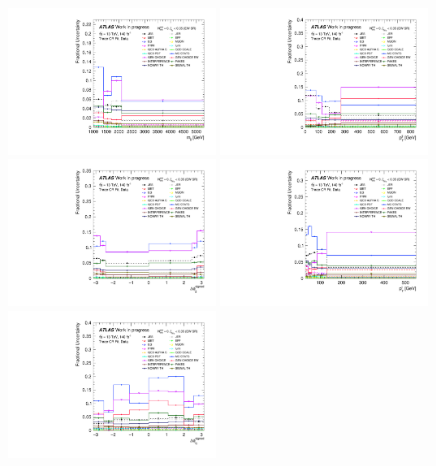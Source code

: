 \begin{figure}[H]
    \centering
    \includegraphics[width=0.49\textwidth]{plots/diffx/sigthresholds/1p6/Systematic_Uncertainties_data_mjj_3cr_QCD_Sh2211_1p6sigma.pdf}
    \includegraphics[width=0.49\textwidth]{plots/diffx/sigthresholds/1p6/Systematic_Uncertainties_data_jj_pt_3cr_QCD_Sh2211_1p6sigma.pdf}
    \includegraphics[width=0.49\textwidth]{plots/diffx/sigthresholds/1p6/Systematic_Uncertainties_data_jj_dphi_3cr_QCD_Sh2211_1p6sigma.pdf}
    \includegraphics[width=0.49\textwidth]{plots/diffx/sigthresholds/1p6/Systematic_Uncertainties_data_lep_pt_3cr_QCD_Sh2211_1p6sigma.pdf}
    \includegraphics[width=0.49\textwidth]{plots/diffx/sigthresholds/1p6/Systematic_Uncertainties_data_lepgam_dphi_3cr_QCD_Sh2211_1p6sigma.pdf}

\end{figure}
